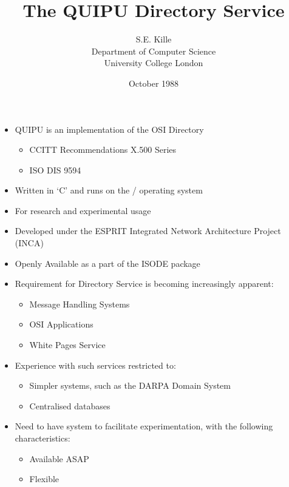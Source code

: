 


\title {The QUIPU Directory Service}

\author {S.E. Kille \\
Department of Computer Science \\
University College London}

\date {October 1988}
\raggedright



\maketitlepage

\begin {bwslide}

\begin {itemize}
\item QUIPU is an implementation of the OSI Directory
\begin {itemize}
\item CCITT Recommendations  X.500 Series
\item ISO DIS 9594
\end {itemize}
\item Written in `C' and runs on the \unix/ operating system
\item For research and experimental usage
\item Developed under the ESPRIT Integrated Network Architecture Project
(INCA)
\item Openly Available as a part of the ISODE package
\end {itemize}
\end {bwslide}

\begin {bwslide}
\begin {itemize}
\item Requirement for Directory Service is becoming increasingly apparent:
\begin {itemize}
\item Message Handling Systems
\item OSI Applications
\item White Pages Service
\end {itemize}

\item Experience with such services restricted to:
\begin {itemize}
\item Simpler systems, such as the DARPA Domain System
\item Centralised databases
\end {itemize}

\item Need to have system to facilitate experimentation, with the following
characteristics:
\begin {itemize}
\item Available ASAP
\item Flexible
\end {itemize}

\end {itemize}
\end {bwslide}



